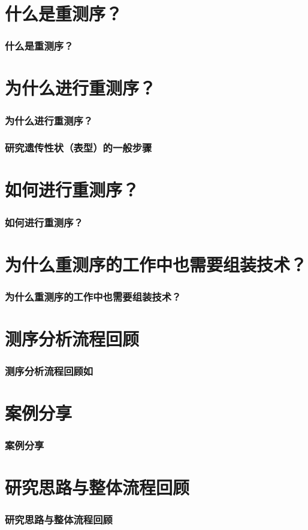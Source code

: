 \documentclass[12pt]{beamer}
\begin{document}
\section{什么是重测序？}
\begin{frame}\frametitle{什么是重测序？}
  \end{frame}
\section{为什么进行重测序？}
\begin{frame}\frametitle{为什么进行重测序？}
  \end{frame}

\begin{frame}\frametitle{研究遗传性状（表型）的一般步骤}
  \end{frame}

\section{如何进行重测序？}
\begin{frame}\frametitle{如何进行重测序？}
  \end{frame}

\section{为什么重测序的工作中也需要组装技术？}
\begin{frame}\frametitle{为什么重测序的工作中也需要组装技术？}
  \end{frame}


\section{测序分析流程回顾}

\begin{frame}\frametitle{测序分析流程回顾如}
  \end{frame}

\section{案例分享}
\begin{frame}\frametitle{案例分享}
  \end{frame}

\section{研究思路与整体流程回顾}
\begin{frame}\frametitle{研究思路与整体流程回顾}
  \end{frame}

\begin{frame}
 
\end{frame}
\end{document}
